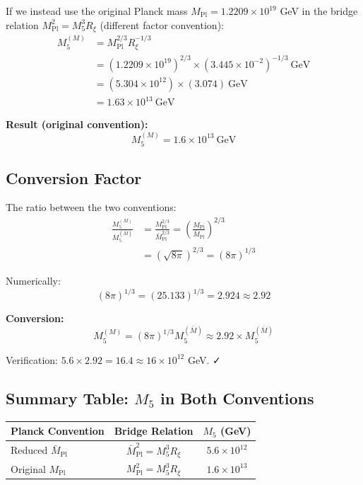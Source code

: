 \documentclass[11pt,a4paper]{article}
\newcommand{\Rxi}{R_\xi}
\newcommand{\Mpl}{M_{\mathrm{Pl}}}
\newcommand{\Mplbar}{\bar{M}_{\mathrm{Pl}}}
\newcommand{\Mfive}{M_5}
\begin{document}
If we instead use the original Planck mass $\Mpl = 1.2209 \times 10^{19}$ GeV in the
bridge relation $\Mpl^2 = \Mfive^3 \Rxi$ (different factor convention):
\begin{align}
\Mfive^{(M)} &= \Mpl^{2/3} \Rxi^{-1/3} \nonumber\\
&= (1.2209 \times 10^{19})^{2/3} \times (3.445 \times 10^{-2})^{-1/3}~\mathrm{GeV} \nonumber\\
&= (5.304 \times 10^{12}) \times (3.074)~\mathrm{GeV} \nonumber\\
&= 1.63 \times 10^{13}~\mathrm{GeV}
\label{eq:M5-original}
\end{align}

\textbf{Result (original convention):}
\begin{equation}
\boxed{\Mfive^{(M)} = 1.6 \times 10^{13}~\mathrm{GeV}}
\label{eq:M5-original-boxed}
\end{equation}

\subsection{Conversion Factor}

The ratio between the two conventions:
\begin{align}
\frac{\Mfive^{(M)}}{\Mfive^{(\bar{M})}} &= \frac{\Mpl^{2/3}}{\Mplbar^{2/3}}
= \left(\frac{\Mpl}{\Mplbar}\right)^{2/3} \nonumber\\
&= \left(\sqrt{8\pi}\right)^{2/3} = (8\pi)^{1/3}
\label{eq:M5-ratio-derivation}
\end{align}

Numerically:
\begin{equation}
(8\pi)^{1/3} = (25.133)^{1/3} = 2.924 \approx 2.92
\label{eq:8pi-third}
\end{equation}

\textbf{Conversion:}
\begin{equation}
\boxed{\Mfive^{(M)} = (8\pi)^{1/3} \Mfive^{(\bar{M})} \approx 2.92 \times \Mfive^{(\bar{M})}}
\label{eq:M5-conversion}
\end{equation}

Verification: $5.6 \times 2.92 = 16.4 \approx 16 \times 10^{12}$ GeV. ✓

\subsection{Summary Table: $\Mfive$ in Both Conventions}

\begin{center}
\begin{tabular}{lcc}
\toprule
\textbf{Planck Convention} & \textbf{Bridge Relation} & \textbf{$\Mfive$ (GeV)} \\
\midrule
Reduced $\Mplbar$ & $\Mplbar^2 = \Mfive^3 \Rxi$ & $5.6 \times 10^{12}$ \\
Original $\Mpl$ & $\Mpl^2 = \Mfive^3 \Rxi$ & $1.6 \times 10^{13}$ \\
\bottomrule
\end{tabular}
\end{center}
\end{document}
